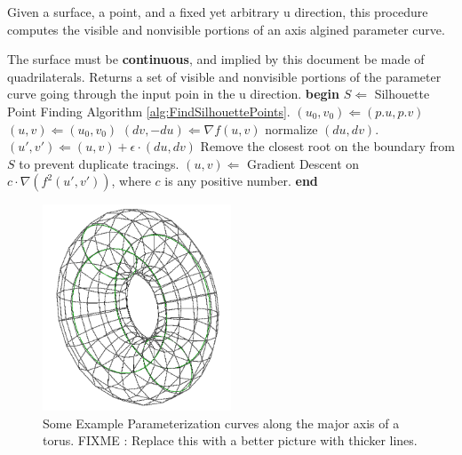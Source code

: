 \documentclass[12pt, letterpaper]{article}
\begin{document}
		\begin{algorithm}                      %
		\caption{Given a surface, a point, and a fixed yet arbitrary u direction, this procedure computes the visible and nonvisible portions of an axis algined parameter curve.}
		\label{alg:TraceParameterizationCurves}       %
		\begin{algorithmic}                    %
			\REQUIRE The surface must be \textbf{continuous}, and implied by this document be made of quadrilaterals.
			\ENSURE Returns a set of visible and nonvisible portions of the parameter curve going through the input poin in the u direction.
			\STATE \textbf{begin}
			\STATE $S \Leftarrow $ Silhouette Point Finding Algorithm \ref{alg:FindSilhouettePoints}.
			        \STATE $(u_{0}, v_{0}) \Leftarrow (p.u, p.v)$
				\STATE $(u, v) \Leftarrow (u_{0}, v_{0})$
				\REPEAT
				        \STATE $(dv, -du) \Leftarrow \nabla f(u,v)$
					\STATE normalize $(du, dv)$.
					\STATE $(u', v') \Leftarrow (u, v) + \epsilon \cdot (du, dv)$
						\STATE Remove the closest root on the boundary from $S$ to prevent duplicate tracings.
					\ENDIF
					\STATE $(u, v) \Leftarrow$ Gradient Descent on $c \cdot \nabla(f^{2}(u',v'))$, where $c$ is any positive number.
				 
			\ENDFOR
			\STATE \textbf{end}
		\end{algorithmic}
		\end{algorithm}

		\begin{figure}[h]
		\centering
		\includegraphics[width=0.5\textwidth]{Parameter_aligned_curves}
		\caption{Some Example Parameterization curves along the major axis of a torus. FIXME : Replace this with a better picture with thicker lines.}
		\label{fig:parameter_aligned_curves_torus}
		\end{figure}
\end{document}
